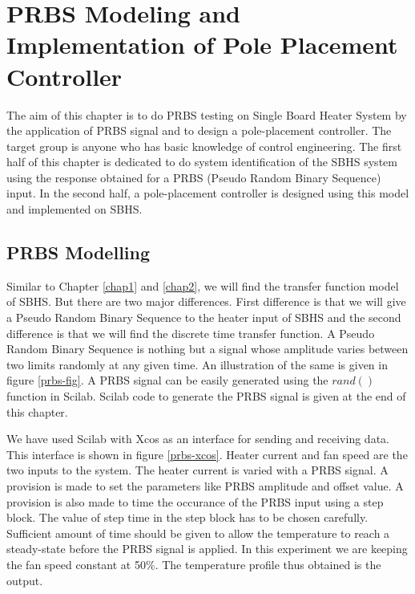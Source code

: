 \chapter{PRBS Modeling and Implementation of Pole Placement Controller}
The aim of this chapter is to do PRBS testing on Single Board Heater System by the application of PRBS signal 
and to design a pole-placement controller. The target group is anyone who has basic knowledge of control engineering. The first half of this chapter is dedicated to do system identification of the SBHS system using the response obtained for a 
PRBS (Pseudo Random Binary Sequence) input. In the second half, a pole-placement controller is designed using this model and 
implemented on SBHS.

\section{PRBS Modelling}

Similar to Chapter \ref{chap1} and \ref{chap2}, we will find the transfer function model of SBHS. 
But there are two major differences. First difference is that we will give a Pseudo Random Binary Sequence to the 
heater input of SBHS and the second difference is that we will find the discrete time transfer function. A Pseudo Random 
Binary Sequence is nothing but a signal whose amplitude varies between two limits randomly at any given time. An 
illustration of the same is given in figure \ref{prbs-fig}. A PRBS signal can be easily generated using the $rand()$ 
function in Scilab. Scilab code to generate the PRBS signal is given at the end of this chapter.

We have used Scilab with Xcos as an interface for sending and receiving data. This interface is shown in figure \ref{prbs-xcos}.
Heater current and fan speed are the two inputs to the system. The heater current is varied with a PRBS signal. A provision
is made to set the parameters like PRBS amplitude and offset value. A provision is also made to time the occurance of the PRBS 
input using a step block. The value of step time in the step block has to be chosen carefully. Sufficient amount of time
should be given to allow the temperature to reach a steady-state before the PRBS signal is applied. In this experiment we are
keeping the fan speed constant at 50\%. The temperature profile thus obtained is the output.


